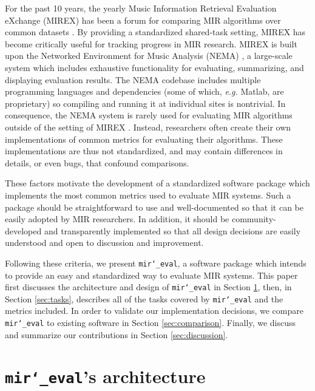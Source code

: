 \documentclass{article}
\def\eg{\emph{e.g.}}
\def\mireval{\texttt{mir\char`_eval}}
\begin{document}
For the past 10 years, the yearly Music Information Retrieval Evaluation eXchange (MIREX) has been a forum for comparing MIR algorithms over common datasets \cite{downie2008music}.
By providing a standardized shared-task setting, MIREX has become critically useful for tracking progress in MIR research.
MIREX is built upon the Networked Environment for Music Analysis (NEMA) \cite{west2010networked}, a large-scale system which includes exhaustive functionality for evaluating, summarizing, and displaying evaluation results.
The NEMA codebase includes multiple programming languages and dependencies (some of which, \eg{} Matlab, are proprietary) so compiling and running it at individual sites is nontrivial. 
%
In consequence, the NEMA system is rarely used for evaluating MIR algorithms outside of the setting of MIREX \cite{downie2008music}.
Instead, researchers often create their own implementations of common metrics for evaluating their algorithms.
These implementations are thus not standardized, and may contain differences in details, or even bugs, that confound comparisons.

These factors motivate the development of a standardized software package which implements the most common metrics used to evaluate MIR systems.
Such a package should be straightforward to use and well-documented so that it can be easily adopted by MIR researchers.
In addition, it should be community-developed and transparently implemented so that all design decisions are easily understood and open to discussion and improvement.

Following these criteria, we present \mireval{}, a software package which intends to provide an easy and standardized way to evaluate MIR systems.
This paper first discusses the architecture and design of \mireval{} in Section \ref{sec:architecture}, then, in Section \ref{sec:tasks}, describes all of the tasks covered by \mireval{} and the metrics included.
In order to validate our implementation decisions, we compare \mireval{} to existing software in Section \ref{sec:comparison}.
Finally, we discuss and summarize our contributions in Section \ref{sec:discussion}.

\section{\mireval{}'s architecture}
\label{sec:architecture}
\end{document}
